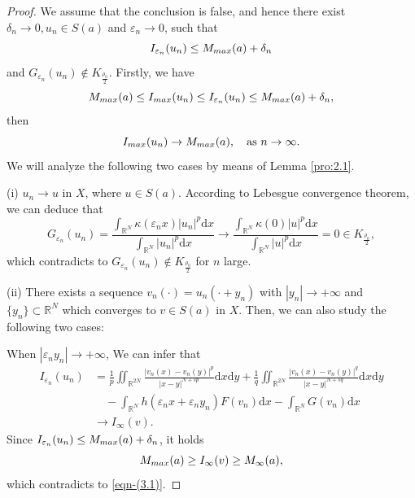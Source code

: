 \documentclass[10pt,a4paper]{amsart}
\numberwithin{equation}{section}
\begin{document}
\begin{proof}
We assume that the conclusion is false, and hence there exist 
$\delta_n \to 0, u_n \in S(a)$ and $\varepsilon_n \to 0$, such that
$$
I_{\varepsilon_n }(u_n)\le M_{\rm max}(a)+\delta_n
$$
and
$G_{\varepsilon_n}(u_n)\not\in K_{\frac{\rho_0}{2}}$.
Firstly, we have
$$
M_{\rm max}(a)\le I_{\rm max}(u_n)\le I_{\varepsilon_n }(u_n)
\le M_{\rm max}(a)+\delta_n,
$$
then
$$
I_{\rm max}(u_n)\to M_{\rm max}(a),\quad \text{as } n\to\infty.
$$
We will analyze the following two cases by means of Lemma \ref{pro:2.1}.

(i) $u_n\to u$ in $X$, where $u\in S(a)$. According to Lebesgue convergence 
theorem, we can deduce that
$$
G_{\varepsilon_n}(u_n)=\frac{\int_{\mathbb{R}^N}\kappa(\varepsilon_n x)|u_n|^{p}
\mathrm{d}x}{\int_{\mathbb{R}^N}|u_n|^{p}\mathrm{d}x}
\to\frac{\int_{\mathbb{R}^N}\kappa(0)|u|^{p}\mathrm{d}x}{\int_{\mathbb{R}^N}
|u|^{p}\mathrm{d}x}=0\in K_{\frac{\rho_0}{2}},
$$
which contradicts to $G_{\varepsilon_n}(u_n)\not\in K_{\frac{\rho_0}{2}}$ 
for $n$ large.

(ii) There exists a sequence $v_n(\cdot)=u_n(\cdot+y_n)$ with $|y_n|\to+\infty$ and 
$\{y_n\}\subset \mathbb{R}^N$ which converges to $v \in S(a)$ in $X$.
Then, we can also study the following two cases:

When $|\varepsilon_n y_n|\to+\infty$, We can infer that
\begin{align*}
 I_{\varepsilon_n}(u_n)
&= \frac{1}{p}\iint_{\mathbb{R}^{2N}}\frac{|v_n(x)-v_n(y)|^{p}}{|x-y|^{N+sp}}
 \mathrm{d}x\mathrm{d}y+\frac{1}{q}\iint_{\mathbb{R}^{2N}}\frac{|v_n(x)
 -v_n(y)|^{q}}{|x-y|^{N+sq}}\mathrm{d}x\mathrm{d}y\\
&\quad -\int_{\mathbb{R}^N}h(\varepsilon_n x+\varepsilon_n y_n)F(v_n)\mathrm{d}x
  -\int_{\mathbb{R}^N}G(v_n)\mathrm{d}x\\
&\to I_\infty(v).
 \end{align*}
Since $I_{\varepsilon_n}(u_n)\le M_{\rm max}(a)+\delta_n$, it holds
$$
M_{\rm max}(a)\ge I_\infty(v)\ge M_\infty(a),
$$
which contradicts to \eqref{eqn-(3.1)}.


\end{proof}
\end{document}
